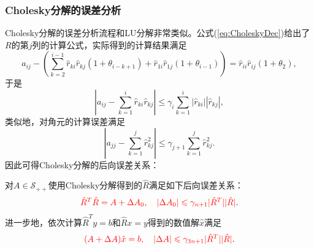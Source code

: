 \documentclass[a4paper,10pt]{ctexart}
\begin{document}
\subsubsection{Cholesky分解的误差分析}
Cholesky分解的误差分析流程和LU分解非常类似。公式(\ref{eq:CholeskyDec})给出了$ R $的第$ j $列的计算公式，实际得到的计算结果满足
\[
      a_{ij} - \left( \sum_{k=2}^{i-1} \hat{r}_{ki}\hat{r}_{kj}(1+\theta_{i-k+1}) + \hat{r}_{1i} \hat{r}_{1j}(1+\theta_{i-1}) \right) = \hat{r}_{ii}\hat{r}_{ij}(1+\theta_2),
\]
于是
\begin{equation}
    \left\vert a_{ij} - \sum_{k=1}^i \hat{r}_{ki} \hat{r}_{kj} \right\vert \leqslant \gamma_i \sum_{k=1}^i |\hat{r}_{ki}| |\hat{r}_{kj}|,
\end{equation}
类似地，对角元的计算误差满足
\begin{equation}
    \left\vert a_{jj} - \sum_{k=1}^{j} \hat{r}_{kj}^2 \right\vert \leqslant \gamma_{j+1} \sum_{k=1}^{j} \hat{r}_{kj}^2.
\end{equation}
因此可得Cholesky分解的后向误差关系：
\begin{theorem}
    对$ A\in \mathcal{S}_{++} $使用Cholesky分解得到的$ \hat{R} $满足如下后向误差关系：
    \begin{equation}\label{eq:CholeskyBackError_1}
        \textcolor{red}{\hat{R}^T\hat{R} = A+\Delta A_0,\quad |\Delta A_0| \leqslant \gamma_{n+1} |\hat{R}^T| |\hat{R}|}.
    \end{equation}
    进一步地，依次计算$ \hat{R}^Ty=b $和$ \hat{R}x=y $得到的数值解$ \hat{x} $满足
    \begin{equation}\label{eq:CholeskyBackError_2}
        \textcolor{red}{(A+\Delta A)\hat{x} = b,\quad |\Delta A| \leqslant \gamma_{3n+1} |\hat{R}^T| |\hat{R}|}.
    \end{equation}
\end{theorem}
\end{document}
